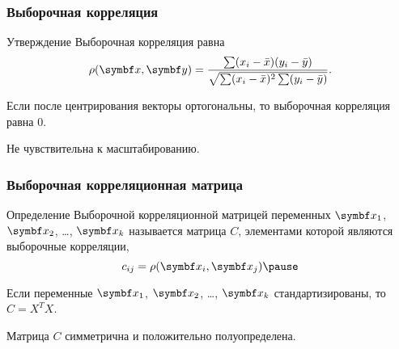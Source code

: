 \begin{frame}
  \frametitle{Выборочная корреляция}

  \begin{block}{Утверждение}
    Выборочная корреляция равна 
    \[
      \rho(\bx, \by) = \frac{\sum (x_i - \bar x)(y_i - \bar y)}{\sqrt{\sum (x_i - \bar x)^2 \sum (y_i - \bar y)}}.
    \]
  \end{block}

 
  Если после центрирования векторы ортогональны, то выборочная корреляция равна $0$. \pause

  Не чувствительна к масштабированию.

\end{frame}


\begin{frame}
  \frametitle{Выборочная корреляционная матрица}

  \begin{block}{Определение}
  \alert{Выборочной корреляционной матрицей} переменных $\bx_1$, $\bx_2$, \ldots, $\bx_k$ называется
  матрица $C$, элементами которой являются выборочные корреляции,
  \[
  c_{ij} = \rho(\bx_i, \bx_j) \pause
  \] 
  \end{block}

  Если переменные $\bx_1$, $\bx_2$, \ldots, $\bx_k$ стандартизированы, то $C=X^TX$. \pause

  Матрица $C$ симметрична и положительно полуопределена. 

\end{frame}


